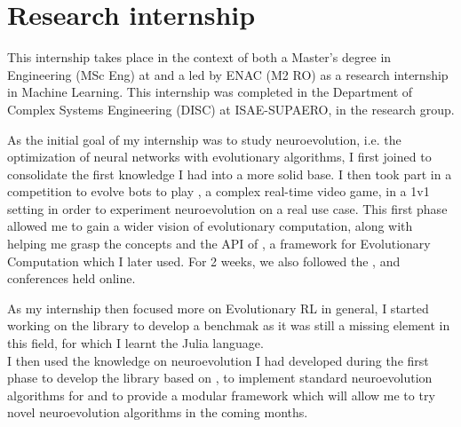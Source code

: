 \section*{Research internship}

This internship takes place in the context of both a Master's degree in Engineering (MSc Eng) at  and a  led by ENAC (M2 RO) as a research internship in Machine Learning. This internship was completed in the Department of Complex Systems Engineering (DISC) at ISAE-SUPAERO, in the  research group.


As the initial goal of my internship was to study neuroevolution, i.e. the optimization of neural networks with evolutionary algorithms, I first joined  to consolidate the first knowledge I had into a more solid base. I then took part in a competition to evolve bots to play \dota, a complex real-time video game, in a 1v1 setting in order to experiment neuroevolution on a real use case. This first phase allowed me to gain a wider vision of evolutionary computation, along with helping me grasp the concepts and the API of \cambrian, a framework for Evolutionary Computation which I later used. For 2 weeks, we also followed the ,  and  conferences held online. 

As my internship then focused more on Evolutionary RL in general, I started working on the \berl library to develop a benchmak as it was still a missing element in this field, for which I learnt the Julia language. \\
I then used the knowledge on neuroevolution I had developed during the first phase to develop the \neuroevo library based on \cambrian, to implement standard neuroevolution algorithms for \berl  and to provide a modular framework which will allow me to try novel neuroevolution algorithms in the coming months.

